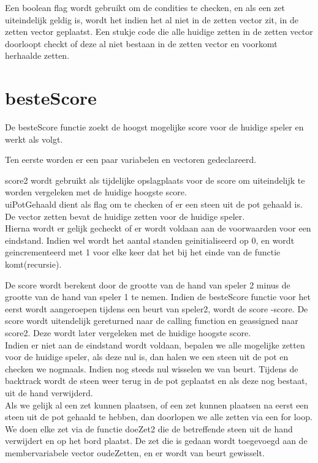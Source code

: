 \documentclass{article}
\begin{document}
Een boolean flag wordt gebruikt om de condities te checken, en als een zet uiteindelijk geldig is, wordt het indien het al niet in de zetten vector zit, in de zetten vector geplaatst. Een stukje code die alle huidige zetten in de zetten vector doorloopt checkt of deze al niet bestaan in de zetten vector en voorkomt herhaalde zetten.
\newpage
\section{besteScore}

De besteScore functie zoekt de hoogst mogelijke score voor de huidige speler en werkt als volgt.

Ten eerste worden er een paar variabelen en vectoren gedeclareerd.

score2 wordt gebruikt als tijdelijke opslagplaats voor de score om uiteindelijk te worden vergeleken met de huidige hoogste score.\\

uiPotGehaald dient als flag om te checken of er een steen uit de pot gehaald is.\\

De vector zetten bevat de huidige zetten voor de huidige speler. \\

Hierna wordt er gelijk gecheckt of er wordt voldaan aan de voorwaarden voor een eindstand. Indien wel wordt het aantal standen geinitialiseerd op 0, en wordt geincrementeerd met 1 voor elke keer dat het bij het einde van de functie komt(recursie).

De score wordt berekent door de grootte van de hand van speler 2 minus de grootte van de hand van speler 1 te nemen. Indien de besteScore functie voor het eerst wordt aangeroepen tijdens een beurt van speler2, wordt de score -score. De score wordt uitendelijk gereturned naar de calling function en geassigned naar score2. Deze wordt later vergeleken met de huidige hoogste score.\\

Indien er niet aan de eindstand wordt voldaan, bepalen we alle mogelijke zetten voor de huidige speler, als deze nul is, dan halen we een steen uit de pot en checken we nogmaals. Indien nog steeds nul wisselen we van beurt. Tijdens de backtrack wordt de steen weer terug in de pot geplaatst en als deze nog bestaat, uit de hand verwijderd.\\

Als we gelijk al een zet kunnen plaatsen, of een zet kunnen plaatsen na eerst een steen uit de pot gehaald te hebben, dan doorlopen we alle zetten via een for loop. We doen elke zet via de functie doeZet2 die de betreffende steen uit de hand verwijdert en op het bord plaatst. De zet die is gedaan wordt toegevoegd aan de membervariabele vector oudeZetten, en er wordt van beurt gewisselt.\\
\end{document}

